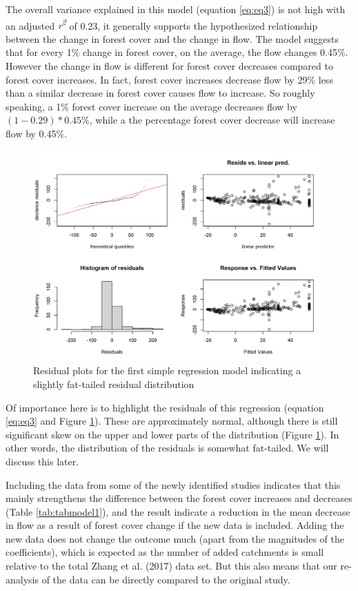 \documentclass[]{elsarticle} %
\begin{document}
The overall variance explained in this model (equation \eqref{eq:eq3}) is not high with an adjusted \emph{r\textsuperscript{2}} of 0.23, it generally supports the hypothesized relationship between the change in forest cover and the change in flow. The model suggests that for every 1\% change in forest cover, on the average, the flow changes 0.45\%. However the change in flow is different for forest cover decreases compared to forest cover increases. In fact, forest cover increases decrease flow by 29\% less than a similar decrease in forest cover causes flow to increase. So roughly speaking, a 1\% forest cover increase on the average decreases flow by \((1 - 0.29)*0.45\%\), while a the percentage forest cover decrease will increase flow by 0.45\%.

\begin{figure}
\includegraphics[width=0.9\linewidth]{residual_plot_model1} \caption{Residual plots for the first simple regression model indicating a slightly fat-tailed residual distribution}\label{fig:gamcheck}
\end{figure}

Of importance here is to highlight the residuals of this regression (equation \eqref{eq:eq3} and Figure \ref{fig:gamcheck}). These are approximately normal, although there is still significant skew on the upper and lower parts of the distribution (Figure \ref{fig:gamcheck}). In other words, the distribution of the residuals is somewhat fat-tailed. We will discuss this later.

Including the data from some of the newly identified studies indicates that this mainly strengthens the difference between the forest cover increases and decreases (Table \ref{tab:tabmodel1}), and the result indicate a reduction in the mean decrease in flow as a result of forest cover change if the new data is included. Adding the new data does not change the outcome much (apart from the magnitudes of the coefficients), which is expected as the number of added catchments is small relative to the total Zhang et al. (2017) data set. But this also means that our re-analysis of the data can be directly compared to the original study.
\end{document}
